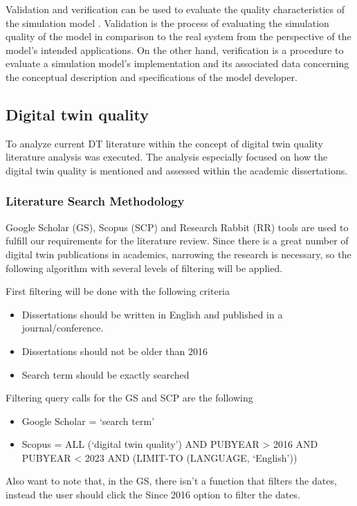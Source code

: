 \documentclass[9pt,conference]{IEEEtran}
\begin{document}
    Validation and verification can be used to evaluate the quality characteristics of the simulation model \cite{StewartSimulation} \cite{VerificationValidationSergent} \cite{OsmanBalci}. 
    Validation is the process of evaluating the simulation quality of the model in comparison to the real system from the perspective of the model's intended applications. 
    On the other hand, verification is a procedure to evaluate a simulation model's implementation and its associated data concerning the conceptual description and specifications of the model developer. 

    \subsection*{Digital twin quality}
    To analyze current DT literature within the concept of digital twin quality literature analysis was executed. 
    The analysis especially focused on how the digital twin quality is mentioned and assessed within the academic dissertations.

    \subsubsection*{Literature Search Methodology}
    Google Scholar (GS), Scopus (SCP) and Research Rabbit (RR) tools are used to fulfill our requirements for the literature review. Since there is a great number of digital twin publications in academics,
    narrowing the research is necessary, so the following algorithm with several levels of filtering will be applied.

    First filtering will be done with the following criteria

    \begin{itemize}
        \item  Dissertations should be written in English and published in a journal/conference.
        \item  Dissertations should not be older than 2016
        \item  Search term should be exactly searched
    \end{itemize}

    Filtering query calls for the GS and SCP are the following
    \begin{itemize}
        \item Google Scholar = `search term'
        \item Scopus = ALL (`digital twin quality') AND PUBYEAR > 2016 AND PUBYEAR < 2023 AND (LIMIT-TO (LANGUAGE, `English'))
    \end{itemize}
    Also want to note that, in the GS, there isn't a function that filters the dates, instead the user should click the Since 2016 option to filter the dates.
\end{document}
